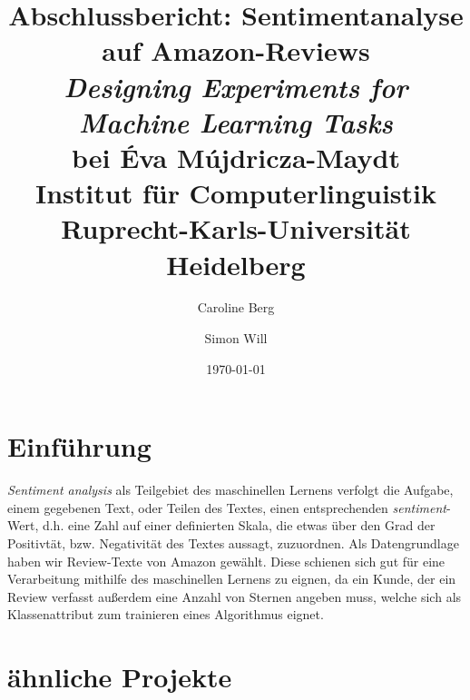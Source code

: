 \documentclass[a4paper]{article}
\title{Abschlussbericht: Sentimentanalyse auf Amazon-Reviews\\[0.5cm]
\large \textit{Designing Experiments for Machine Learning Tasks}\\[0.2cm]
\large bei Éva Mújdricza-Maydt\\[0.2cm]
\large Institut für Computerlinguistik\\[0.2cm]
\large Ruprecht-Karls-Universität Heidelberg\\}
\author{Caroline Berg \and Simon Will}
\date{\today}
\newcommand{\ourhighlight}[1]{\textit{#1}}
\begin{document}
\maketitle
\newpage


\tableofcontents
\newpage



\section{Einführung}

\ourhighlight{Sentiment analysis} als Teilgebiet des maschinellen Lernens verfolgt die Aufgabe, einem gegebenen Text, oder Teilen des Textes, einen entsprechenden \ourhighlight{sentiment}-Wert, d.h. eine Zahl auf einer definierten Skala, die etwas über den Grad der Positivtät, bzw. Negativität des Textes aussagt, zuzuordnen.\newline
Als Datengrundlage haben wir Review-Texte von Amazon gewählt. Diese schienen sich gut für eine Verarbeitung mithilfe des maschinellen Lernens zu eignen, da ein Kunde, der ein Review verfasst außerdem eine Anzahl von Sternen angeben muss, welche sich als Klassenattribut zum trainieren eines Algorithmus eignet. 


\section{ähnliche Projekte}
\end{document}
